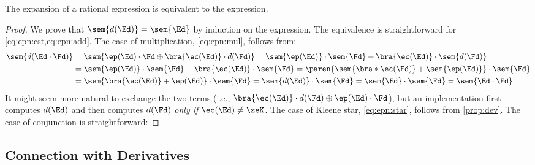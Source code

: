 \documentclass[a4paper,USenglish]{lipics}
\begin{document}
\begin{Proposition}
  The expansion of a rational expression is equivalent to the expression.
\end{Proposition}
\begin{proof}
  We prove that $\sem{d(\Ed)} = \sem{\Ed}$ by induction on the expression.
  The equivalence is straightforward for
  \cref{eq:epn:cst,eq:epn:add}.
The case of multiplication, \cref{eq:epn:mul}, follows from:
  \begin{align*}
    \sem{d(\Ed \cdot \Fd)}
    &= \sem{\ep(\Ed) \cdot \Fd \oplus \bra{\ec(\Ed)} \cdot d(\Fd)}
    = \sem{\ep(\Ed)}\cdot\sem{\Fd} + \bra{\ec(\Ed)} \cdot \sem{d(\Fd)} \\
    &= \sem{\ep(\Ed)}\cdot\sem{\Fd} + \bra{\ec(\Ed)} \cdot \sem{\Fd}
    = \paren{\sem{\bra*{\ec(\Ed)}}+\sem{\ep(\Ed)}} \cdot\sem{\Fd} \\
    &= \sem{\bra{\ec(\Ed)} + \ep(\Ed)} \cdot\sem{\Fd}
    = \sem{d(\Ed)} \cdot \sem{\Fd}
    = \sem{\Ed} \cdot \sem{\Fd}
    = \sem{\Ed\cdot \Fd}
  \end{align*}
  It might seem more natural to exchange the two terms (i.e.,
  $\bra{\ec(\Ed)} \cdot d(\Fd) \oplus \ep(\Ed)\cdot \Fd$), but an
  implementation first computes $d(\Ed)$ and then computes $d(\Fd)$
  \emph{only if} $\ec(\Ed) \ne \zeK$.
The case of Kleene star, \cref{eq:epn:star}, follows from \cref{prop:dev}.
  The case of conjunction is straightforward:
\end{proof}


\subsection{Connection with Derivatives}
\end{document}
